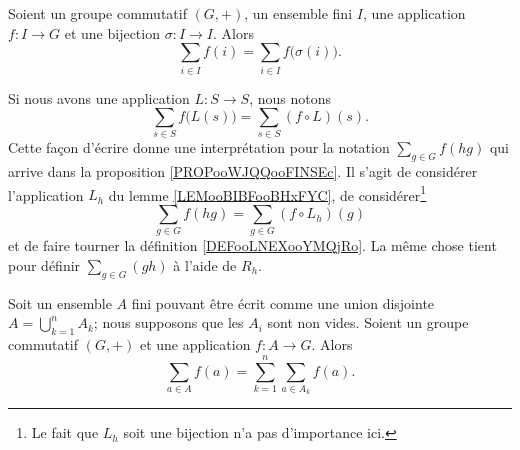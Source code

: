 \begin{proposition}     \label{PROPooJBQVooNqWErk}
	Soient un groupe commutatif \( (G,+)\), un ensemble fini \( I\), une application \( f\colon I\to G\) et une bijection \( \sigma\colon I\to I\). Alors
	\begin{equation}
		\sum_{i\in I}f(i)=\sum_{i\in I}f\big( \sigma(i) \big).
	\end{equation}
\end{proposition}

Si nous avons une application \( L\colon S\to S\), nous notons
\begin{equation}
	\sum_{s\in S}f\big( L(s) \big)=\sum_{s\in S}(f\circ L)(s).
\end{equation}
Cette façon d'écrire donne une interprétation pour la notation \( \sum_{g\in G}f(hg)\) qui arrive dans la proposition \ref{PROPooWJQQooFINSEc}. Il s'agit de considérer l'application \( L_h\) du lemme \ref{LEMooBIBFooBHxFYC}, de considérer\footnote{Le fait que \( L_h\) soit une bijection n'a pas d'importance ici.}
\begin{equation}        \label{EQooQQBEooFDOBVG}
	\sum_{g\in G}f(hg)=\sum_{g\in G}(f\circ L_h)(g)
\end{equation}
et de faire tourner la définition \ref{DEFooLNEXooYMQjRo}. La même chose tient pour définir \( \sum_{g\in G}(gh)\) à l'aide de \( R_h\).


\begin{lemma}
	Soit un ensemble \( A\) fini pouvant être écrit comme une union disjointe \( A=\bigcup_{k=1}^nA_k\); nous supposons que les \( A_i\) sont non vides. Soient un groupe commutatif \( (G,+)\) et une application \( f\colon A\to G\). Alors
	\begin{equation}
		\sum_{a\in A}f(a)=\sum_{k=1}^n\sum_{a\in A_k}f(a).
	\end{equation}
\end{lemma}


